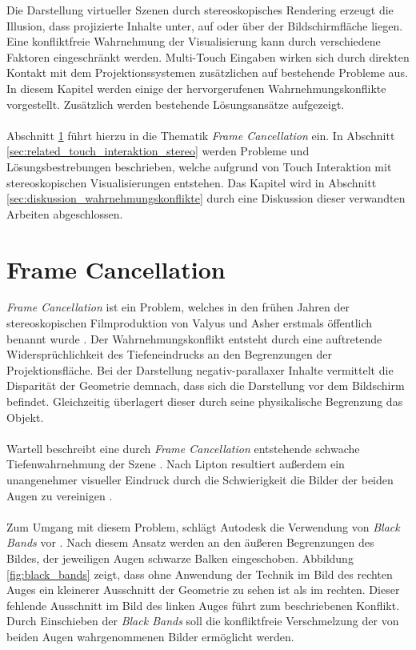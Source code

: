 Die Darstellung virtueller Szenen durch stereoskopisches Rendering erzeugt die Illusion, dass projizierte Inhalte unter, auf oder über der Bildschirmfläche liegen. Eine konfliktfreie Wahrnehmung der Visualisierung kann durch verschiedene Faktoren eingeschränkt werden. Multi-Touch Eingaben wirken sich durch direkten Kontakt mit dem Projektionssystemen zusätzlichen auf bestehende Probleme aus. In diesem Kapitel werden einige der hervorgerufenen Wahrnehmungskonflikte vorgestellt. Zusätzlich werden bestehende Lösungsansätze aufgezeigt.
\\\\
Abschnitt \ref{sec:related_frame_cancellation} führt hierzu in die Thematik \emph{Frame Cancellation} ein. In Abschnitt \ref{sec:related_touch_interaktion_stereo} werden Probleme und Lösungsbestrebungen beschrieben, welche aufgrund von Touch Interaktion mit stereoskopischen Visualisierungen entstehen. Das Kapitel wird in Abschnitt \ref{sec:diskussion_wahrnehmungskonflikte} durch eine Diskussion dieser verwandten Arbeiten abgeschlossen.


\section{Frame Cancellation}
\label{sec:related_frame_cancellation}

\emph{Frame Cancellation} ist ein Problem, welches in den frühen Jahren der stereoskopischen Filmproduktion von Valyus und Asher erstmals öffentlich benannt wurde \cite{valyus:1966}. Der Wahrnehmungskonflikt entsteht durch eine auftretende Widersprüchlichkeit des Tiefeneindrucks an den Begrenzungen der Projektionsfläche. Bei der Darstellung negativ-parallaxer Inhalte vermittelt die Disparität der Geometrie demnach, dass sich die Darstellung vor dem Bildschirm befindet. Gleichzeitig überlagert dieser durch seine physikalische Begrenzung das Objekt. 
\\\\
Wartell beschreibt eine durch \emph{Frame Cancellation} entstehende schwache Tiefenwahrnehmung der Szene \cite{wartell:2001}. Nach Lipton resultiert außerdem ein unangenehmer visueller Eindruck durch die Schwierigkeit die Bilder der beiden Augen zu vereinigen \cite{lipton:2007}. 
\\\\
Zum Umgang mit diesem Problem, schlägt Autodesk die Verwendung von \emph{Black Bands} vor \cite{autodesk:2008}. Nach diesem Ansatz werden an den äußeren Begrenzungen des Bildes, der jeweiligen Augen schwarze Balken eingeschoben. Abbildung \ref{fig:black_bands} zeigt, dass ohne Anwendung der Technik im Bild des rechten Auges ein kleinerer Ausschnitt der Geometrie zu sehen ist als im rechten. Dieser fehlende Ausschnitt im Bild des linken Auges führt zum beschriebenen Konflikt. Durch Einschieben der \emph{Black Bands} soll die konfliktfreie Verschmelzung der von beiden Augen wahrgenommenen Bilder ermöglicht werden. 

